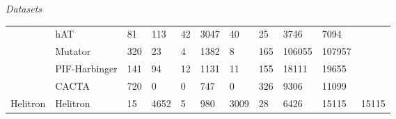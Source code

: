\documentclass[%
  xcolor=table,%
  10pt,%
  aspectratio = 169,%
  compress,%
  t,%
]{beamer}%
\begin{document}
\begin{frame}{}{\textit{Datasets}}
\begin{table}[]
{\begin{tabular}{|l|l|l|l|l|l|l|l|l|l|l|}
                                 & hAT                   & 81            & 113           & 42             & 3047             & 40            & 25            & 3746          & 7094              &                         \\ \cline{2-10}
                                 & Mutator               & 320           & 23            & 4              & 1382             & 8             & 165           & 106055        & 107957            &                         \\ \cline{2-10}
                                 & PIF-Harbinger         & 141           & 94            & 12             & 1131             & 11            & 155           & 18111         & 19655             &                         \\ \cline{2-10}
                                 & CACTA                 & 720           & 0             & 0              & 747              & 0             & 326           & 9306          & 11099             &                         \\ \hline
            Helitron             & Helitron              & 15            & 4652          & 5              & 980              & 3009          & 28            & 6426          & 15115             & 15115                   \\ \hline
        \end{tabular}}
    \end{table}
\end{frame}
\end{document}
